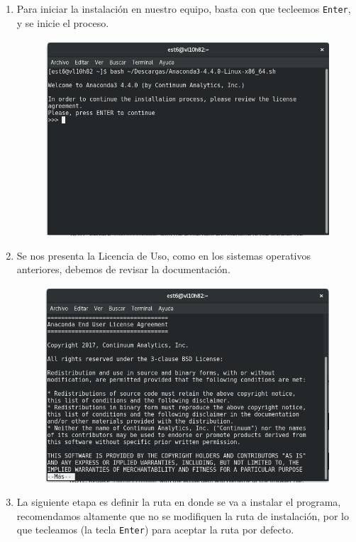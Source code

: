 \documentclass[12pt]{article}
\begin{document}
\begin{enumerate}
\begin{figure}[H]
\end{figure}
\item Para iniciar la instalación en nuestro equipo, basta con que tecleemos \texttt{Enter}, y se inicie el proceso.
\begin{figure}[H]
 	\centering
 	\includegraphics[scale=0.35]{Imagenes/Instalacion_Anaconda_01_linux_05}
\end{figure}
\item Se nos presenta la Licencia de Uso, como en los sistemas operativos anteriores, debemos de revisar la documentación.
\begin{figure}[H]
 	\centering
 	\includegraphics[scale=0.35]{Imagenes/Instalacion_Anaconda_01_linux_06}
\end{figure}
\item La siguiente etapa es definir la ruta en donde se va a instalar el programa, recomendamos altamente que no se modifiquen la ruta de instalación, por lo que tecleamos \keys{\return} (la tecla \texttt{Enter}) para aceptar la ruta por defecto.

\end{enumerate}
\end{document}
